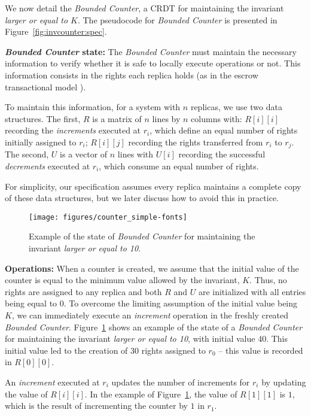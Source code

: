 \documentclass[conference]{IEEEtran}
\newcommand{\InvCounter}{\emph{Bounded Counter}}
\begin{document}
We now detail the \InvCounter{}, a CRDT for maintaining the invariant \emph{larger or equal to $K$}. The pseudocode for \InvCounter{} is presented in Figure~\ref{fig:invcounter:spec}.

{\bf \InvCounter{} state:} 
The \InvCounter{} must maintain the necessary information to verify 
whether it is safe to locally execute operations or not.
This information consists in the rights each replica holds 
(as in the escrow transactional model \cite{escrow}).

To maintain this information, for a system with $n$ replicas,
we use two data structures.
The first, $R$ is a matrix of $n$ lines by $n$ columns with:
$R[i][i]$ recording the \emph{increments} executed at $r_i$, 
which define an equal number of rights initially assigned to $r_i$; 
$R[i][j]$ recording the rights transferred from $r_i$ to $r_j$.
The second, $U$ is a vector of $n$ lines with 
$U[i]$ recording the successful \emph{decrements} executed at $r_i$, 
which consume an equal number of rights.

For simplicity, our specification assumes every replica maintains a complete
copy of these data structures, but we later discuss how to avoid this in practice.

\begin{figure}[t]
\centering
\texttt{[image: figures/counter\_simple-fonts]}
\vspace{-2ex}
\caption{Example of the state of \InvCounter{} for maintaining the invariant \emph{larger or equal to 10}.}
\label{fig:invcounter}
\end{figure}

{\bf Operations:}
When a counter is created, we assume that the initial value of the 
counter is equal to the minimum value allowed by the invariant, $K$. 
Thus, no rights are assigned to any replica and both $R$ and $U$ are 
initialized with all entries being equal to $0$. 
To overcome the limiting assumption of the initial value being $K$, 
we can immediately execute an \emph{increment} operation in the freshly 
created \InvCounter{}.
Figure~\ref{fig:invcounter} shows an example of the state of a 
\InvCounter{} for maintaining the invariant \emph{larger or equal to 10}, 
with initial value 40. This initial value led to the creation of $30$ 
rights assigned to $r_0$ -- this value is recorded in $R[0][0]$. 

An \emph{increment} executed at $r_i$ updates the number 
of increments for $r_i$ by updating the value of $R[i][i]$.
In the example of Figure~\ref{fig:invcounter}, the value of $R[1][1]$ is $1$, 
which is the result of incrementing the counter by $1$ in $r_1$.
\end{document}
